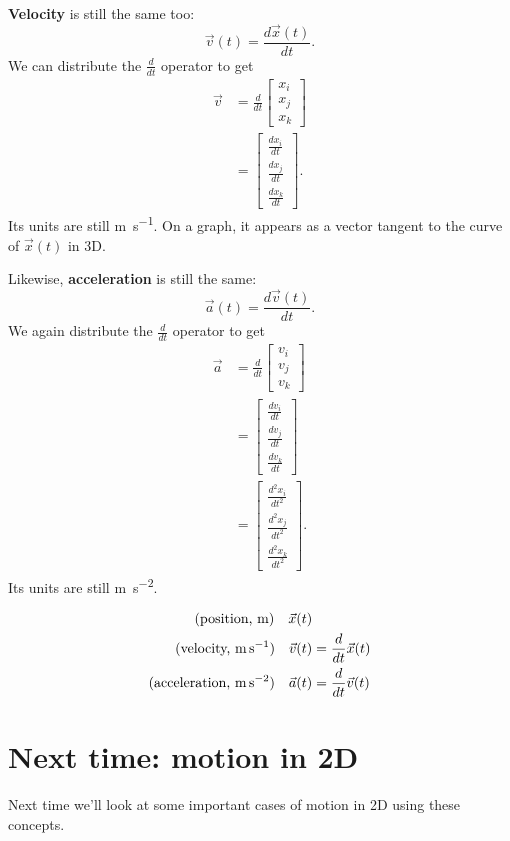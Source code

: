 \documentclass{tufte-handout}
\newcommand\myroot{..}
\begin{document}
\textbf{Velocity} is still the same too:
\begin{equation}
\vec{v}(t) = \dfrac{d\vec{x}(t)}{dt}.
\end{equation}
We can distribute the $\frac{d}{dt}$ operator to get
\begin{align}
\vec{v} &= \frac{d}{dt} \begin{bmatrix} x_i \\ x_j \\ x_k \end{bmatrix} \\
&= \begin{bmatrix} \frac{dx_i}{dt} \\ \frac{dx_j}{dt} \\ \frac{dx_k}{dt} \end{bmatrix}.
\end{align}
Its units are still \si{\meter\per\second}. On a graph, it appears as a vector tangent to the curve of $\vec{x}(t)$ in 3D. 

Likewise, \textbf{acceleration} is still the same:
\begin{equation}
\vec{a}(t) = \dfrac{d\vec{v}(t)}{dt}.
\end{equation}
We again distribute the $\frac{d}{dt}$ operator to get
\begin{align}
\vec{a} &= \frac{d}{dt} \begin{bmatrix} v_i \\ v_j \\ v_k \end{bmatrix} \\
&= \begin{bmatrix} \frac{dv_i}{dt} \\ \frac{dv_j}{dt} \\ \frac{dv_k}{dt} \end{bmatrix}\\
&= \begin{bmatrix} \frac{d^2x_i}{dt^2} \\ \frac{d^2x_j}{dt^2} \\ \frac{d^2x_k}{dt^2} \end{bmatrix}.
\end{align}
Its units are still \si{\meter\per\second\squared}. 

\begin{align}
\text{(position, \si{\meter})}\quad \vec{x}(t) & \\
\text{(velocity, \si{\meter\per\second})}\quad \vec{v}(t) &= \frac{d}{dt} \vec{x}(t) \\
\text{(acceleration, \si{\meter\per\second\squared})}\quad \vec{a}(t) &= \frac{d}{dt} \vec{v}(t)
\end{align}

\section{Next time: motion in 2D}
Next time we'll look at some important cases of motion in 2D using these concepts. 

\nocite{carroll2019spacetime, einstein1915relativity}

\end{document}
